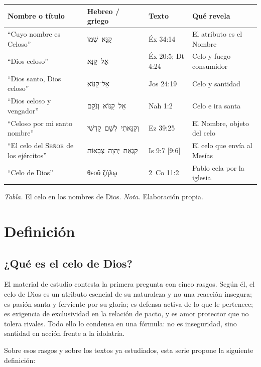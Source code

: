 \documentclass[11pt,letterpaper]{article}
\newcommand{\heb}[1]{\mbox{\foreignlanguage{hebrew}{#1}}}
\newcommand{\grc}[1]{\foreignlanguage{ancientgreek}{#1}}
\newcommand{\SENOR}{\textsc{Señor}}
\begin{document}
\begin{center}
\small\renewcommand{\arraystretch}{1.2}
\begin{tabular}{@{}L{4.2cm}L{3.6cm}L{3.0cm}L{4.6cm}@{}}
\toprule
\textbf{Nombre o título} & \textbf{Hebreo / griego} & \textbf{Texto} & \textbf{Qué revela} \\ \midrule
``Cuyo nombre es Celoso'' & \heb{קַנָּא שְׁמוֹ} & Éx 34:14 & El atributo es el Nombre \\
``Dios celoso'' & \heb{אֵל קַנָּא} & Éx 20:5; Dt 4:24 & Celo y fuego consumidor \\
``Dios santo, Dios celoso'' & \heb{אֵל־קַנּוֹא} & Jos 24:19 & Celo y santidad \\
``Dios celoso y vengador'' & \heb{אֵל קַנּוֹא וְנֹקֵם} & Nah 1:2 & Celo e ira santa \\
``Celoso por mi santo nombre'' & \heb{וְקִנֵּאתִי לְשֵׁם קָדְשִׁי} & Ez 39:25 & El Nombre, objeto del celo \\
``El celo del \SENOR{} de los ejércitos'' & \heb{קִנְאַת יְהוָה צְבָאוֹת} & Is 9:7 [9:6] & El celo que envía al Mesías \\
``Celo de Dios'' & \grc{θεοῦ ζήλῳ} & 2~Co 11:2 & Pablo cela por la iglesia \\ \bottomrule
\end{tabular}\par\smallskip
{\footnotesize\color{gris}\textit{Tabla.} El celo en los nombres de Dios. \textit{Nota.} Elaboración propia.}
\end{center}

\section{Definición}

\subsection{¿Qué es el celo de Dios?}
El material de estudio contesta la primera pregunta con cinco rasgos. Según él, el celo de Dios es un atributo esencial de su naturaleza y no una reacción insegura; es pasión santa y ferviente por su gloria; es defensa activa de lo que le pertenece; es exigencia de exclusividad en la relación de pacto, y es amor protector que no tolera rivales. Todo ello lo condensa en una fórmula: no es inseguridad, sino santidad en acción frente a la idolatría.

Sobre esos rasgos y sobre los textos ya estudiados, esta serie propone la siguiente definición:
\end{document}
